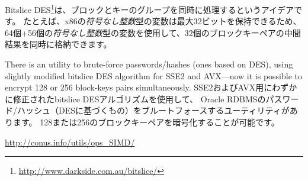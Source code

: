 \label{bitslicedes}
\newcommand{\URLBS}{\url{http://www.darkside.com.au/bitslice/}}

Bitslice DES\footnote{\URLBS}は、ブロックとキーのグループを同時に処理するというアイデアです。
たとえば、x86の\emph{符号なし整数}型の変数は最大32ビットを保持できるため、
64個+56個の\emph{符号なし整数}型の変数を使用して、32個のブロックキーペアの中間結果を同時に格納できます。

\myindex{\oracle}
There is an utility to brute-force \oracle passwords/hashes (ones based on DES),
using slightly modified bitslice DES algorithm for SSE2 and AVX---now it is possible to encrypt 128 
or 256 block-keys pairs simultaneously.
SSE2およびAVX用にわずかに修正されたbitslice DESアルゴリズムを使用して、
Oracle RDBMSのパスワード/ハッシュ（DESに基づくもの）をブルートフォースするユーティリティがあります。
128または256のブロックキーペアを暗号化することが可能です。

\url{http://conus.info/utils/ops_SIMD/}




